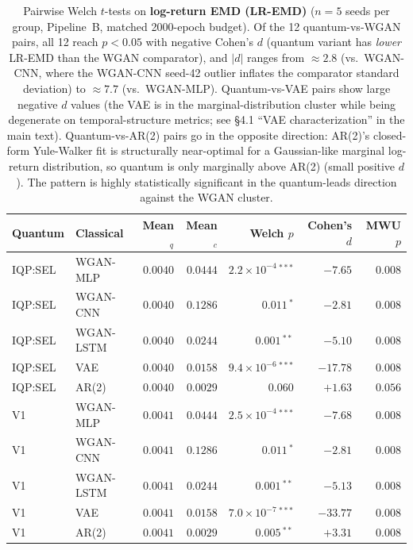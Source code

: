 \begin{table}[!htbp]
\centering
\caption{Pairwise Welch $t$-tests on \textbf{log-return EMD (LR-EMD)}
($n=5$ seeds per group, Pipeline~B, matched 2000-epoch budget). Of
the 12 quantum-vs-WGAN pairs, all 12 reach $p<0.05$ with negative
Cohen's $d$ (quantum variant has \emph{lower} LR-EMD than the WGAN
comparator), and $|d|$ ranges from $\approx 2.8$ (vs.\ WGAN-CNN, where
the WGAN-CNN seed-42 outlier inflates the comparator standard
deviation) to $\approx 7.7$ (vs.\ WGAN-MLP). Quantum-vs-VAE pairs
show large negative $d$ values (the VAE is in the marginal-distribution
cluster while being degenerate on temporal-structure metrics; see
\S4.1 ``VAE characterization'' in the main text). Quantum-vs-AR(2)
pairs go in the opposite direction: AR(2)'s closed-form Yule-Walker
fit is structurally near-optimal for a Gaussian-like marginal log-return
distribution, so quantum is only marginally above AR(2) (small positive
$d$). The pattern is highly statistically significant in the
quantum-leads direction against the WGAN cluster.}
\label{tbl:welch_lr_emd}
\scriptsize
\setlength{\tabcolsep}{4pt}
\begin{tabular}{@{}llrrrrr@{}}
\toprule
\textbf{Quantum} & \textbf{Classical} & \textbf{Mean}$_q$ & \textbf{Mean}$_c$ & \textbf{Welch $p$} & \textbf{Cohen's $d$} & \textbf{MWU $p$} \\
\midrule
IQP:SEL & WGAN-MLP & $0.0040$ & $0.0444$ & $2.2\!\times\!10^{-4}\,^{***}$ & $-7.65$ & $0.008$ \\
IQP:SEL & WGAN-CNN & $0.0040$ & $0.1286$ & $0.011\,^{*}$ & $-2.81$ & $0.008$ \\
IQP:SEL & WGAN-LSTM & $0.0040$ & $0.0244$ & $0.001\,^{**}$ & $-5.10$ & $0.008$ \\
IQP:SEL & VAE & $0.0040$ & $0.0158$ & $9.4\!\times\!10^{-6}\,^{***}$ & $-17.78$ & $0.008$ \\
IQP:SEL & AR(2) & $0.0040$ & $0.0029$ & $0.060$ & $+1.63$ & $0.056$ \\
V1 & WGAN-MLP & $0.0041$ & $0.0444$ & $2.5\!\times\!10^{-4}\,^{***}$ & $-7.68$ & $0.008$ \\
V1 & WGAN-CNN & $0.0041$ & $0.1286$ & $0.011\,^{*}$ & $-2.81$ & $0.008$ \\
V1 & WGAN-LSTM & $0.0041$ & $0.0244$ & $0.001\,^{**}$ & $-5.13$ & $0.008$ \\
V1 & VAE & $0.0041$ & $0.0158$ & $7.0\!\times\!10^{-7}\,^{***}$ & $-33.77$ & $0.008$ \\
V1 & AR(2) & $0.0041$ & $0.0029$ & $0.005\,^{**}$ & $+3.31$ & $0.008$ \\

\end{tabular}
\end{table}
